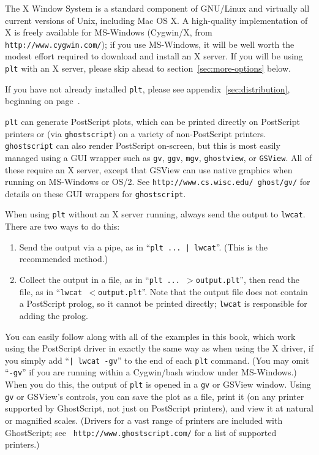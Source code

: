 \documentclass{book}
\begin{document}
%
%
%
%
%
The X Window System is a standard component of GNU/Linux and virtually
all current versions of Unix, including Mac OS X.  A high-quality
implementation of X is freely available for MS-Windows (Cygwin/X, from
{\tt http://www.cygwin.com/});  if you use MS-Windows, it will be well worth
the modest effort required to download and install an X server.  If you will
be using {\tt plt} with an X server, please skip ahead to
section~\ref{sec:more-options} below.

If you have not already installed {\tt plt}, please see
appendix~\ref{sec:distribution}, beginning on page~\pageref{sec:distribution}.

%
%
%
{\tt plt} can generate PostScript plots, which can be printed directly on
PostScript printers or (via {\tt ghostscript}) on a variety of non-PostScript
printers.  {\tt ghostscript} can also render PostScript on-screen, but this
is most easily managed using a GUI wrapper such as {\tt gv}, {\tt ggv},
{\tt mgv}, {\tt ghostview}, or {\tt GSView}.  All of these require an X server,
except that GSView can use native graphics when running on MS-Windows or OS/2.
See {\tt http://\-www.\-cs.\-wisc.\-edu/\-~ghost/\-gv/} for details on these
GUI wrappers for {\tt ghostscript}.

%
When using {\tt plt} without an X server running, always send the output to
{\tt lwcat}.  There are two ways to do this:

%
\begin{enumerate}
\item
Send the output via a pipe, as in ``{\tt plt ... | lwcat}''.  (This is
the recommended method.)

\item
Collect the output in a file, as in ``{\tt plt ... $>$output.plt}'',
then read the file, as in ``{\tt lwcat $<$output.plt}''.   Note that
the output file does not contain a PostScript prolog, so it cannot be
printed directly;  {\tt lwcat} is responsible for adding the prolog.
\end{enumerate}

%
%
You can easily follow along with all of the examples in this book, which work
using the PostScript driver in exactly the same way as when using the X driver,
if you simply add ``{\tt |~lwcat -gv}'' to the end of each {\tt plt} command.
(You may omit ``{\tt -gv}'' if you are running within a Cygwin/bash window
under MS-Windows.)  When you do this, the output of {\tt plt} is opened in a
{\tt gv} or GSView window.  Using {\tt gv} or GSView's controls, you can save
the plot as a file, print it (on any printer supported by GhostScript, not just
on PostScript printers), and view it at natural or magnified scales.  (Drivers
for a vast range of printers are included with GhostScript; see {\tt
http://www.ghostscript.com/} for a list of supported printers.)
\end{document}
